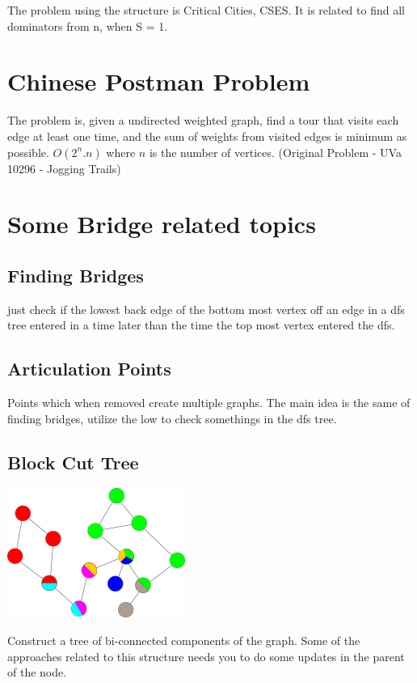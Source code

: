     The problem using the structure is Critical Cities, CSES.
    It is related to find all dominators from n, when S = 1.
    

    \section{Chinese Postman Problem}
    The problem is, given a undirected weighted graph, find a tour that visits each edge at least one time, and the sum of weights from visited edges is minimum as possible.
    $O(2^n.n)$ where $n$ is the number of vertices. (Original Problem - UVa 10296 - Jogging Trails)
    
    
    
    \section{Some Bridge related topics}
    \subsection{Finding Bridges}
    just check if the lowest back edge of the bottom most vertex off an edge in a dfs tree entered in a time later than the time the top most vertex entered the dfs.
    
    \subsection{Articulation Points}
    Points which when removed create multiple graphs.
    The main idea is the same of finding bridges, utilize the low to check somethings in the dfs tree.
    

    \subsection{Block Cut Tree}
    \begin{center}
        \includegraphics[]{imgs/bicomp.png}
    \end{center}
    Construct a tree of bi-connected components of the graph.
    Some of the approaches related to this structure needs you to do some updates in the parent of the node.

